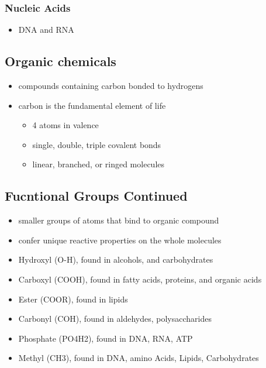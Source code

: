 \documentclass[11pt]{article}
\begin{document}
\subsubsection{Nucleic Acids}
\label{sec:orgbbab69a}
\begin{itemize}
\item DNA and RNA
\end{itemize}
\subsection{Organic chemicals}
\label{sec:org52cba6d}
\begin{itemize}
\item compounds containing carbon bonded to hydrogens
\item carbon is the fundamental element of life
\begin{itemize}
\item 4 atoms in valence
\item single, double, triple covalent bonds
\item linear, branched, or ringed molecules
\end{itemize}
\end{itemize}
\subsection{Fucntional Groups Continued}
\label{sec:org45a6be7}
\begin{itemize}
\item smaller groups of atoms that bind to organic compound
\item confer unique reactive properties on the whole molecules
\item Hydroxyl (O-H), found in alcohols, and carbohydrates
\item Carboxyl (COOH), found in fatty acids, proteins, and organic acids
\item Ester (COOR), found in lipids
\item Carbonyl (COH), found in aldehydes, polysaccharides
\item Phosphate (PO4H2), found in DNA, RNA, ATP
\item Methyl (CH3), found in DNA, amino Acids, Lipids, Carbohydrates
\end{itemize}
\end{document}
